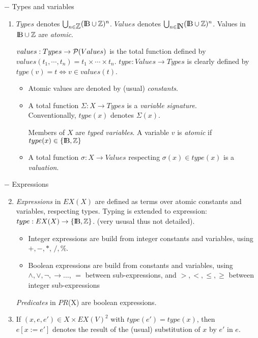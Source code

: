 \documentclass{article}
\newcommand{\NAT}{\mbox{\normalfont I$\!$N}}
\newcommand{\BOOL}{\mbox{\normalfont I$\!$B}}
\newcommand{\INT}{\mbox{\normalfont $\mathbb{Z}$}}
\begin{document}
\begin{definition}\label{def-expr}$~$\par
$-$ Types and variables
\begin{enumerate}
\item $Types$ denotes $\bigcup_{n\in \INT}(\BOOL\cup\INT)^n$. $Values$ denotes $\bigcup_{n\in \NAT}(\BOOL\cup\INT)^n$. Values in $\BOOL\cup\INT$ are {\em atomic}.\par
$values:Types\rightarrow {\cal P}(Values)$ is the total function defined by $values(t_1,\cdots,t_n)=t_1\times\cdots\times t_n$.
$type:Values \rightarrow Types$ is clearly defined by $type(v)=t \Leftrightarrow v\in values(t)$.
  \begin{itemize}
	\item Atomic values are denoted by (usual) {\em constants}.
  \item A total function $\Sigma: X\rightarrow Types$ is a {\em variable signature}.\\
	      Conventionally, $type(x)$ denotes $\Sigma(x)$.\par
	      Members of $X$ are {\em typed variables}. A variable $v$ is {\em atomic} if $type(x)\in\{\BOOL,\INT\}$ 
	\item A total function $\sigma:X\rightarrow Values$ respecting $\sigma(x)\in type(x)$ is a {\em valuation}.
	\end{itemize}
\end{enumerate}
$-$ Expressions
\begin{enumerate}\setcounter{enumi}{1}
\item {\em Expressions} in $EX(X)$ are defined as terms over atomic constants and variables, respecting types. Typing is extended to expression: $type:EX(X)\rightarrow\{\BOOL,\INT\}$. (very ususal thus not detailed).
      \begin{itemize}
      \item Integer expressions are build from integer constants and variables, using $+,-,*$, $/,\%$.
			\item Boolean expressions are build from constants and variables, using $\wedge,\vee, \neg,\rightarrow \ldots$, $=$ between sub-expressions, and $>,<,\leq,\geq$ between integer sub-expressions
			\end{itemize}
			{\em Predicates} in $P\!R$(X) are boolean expressions.
\item If $(x,e,e')\in X\times EX(V)^2$ with $type(e')=type(x)$, then\\ $e[x:=e']$ denotes the result of the (usual) substitution of $x$ by $e'$ in $e$.

\end{enumerate}
\end{definition}
\end{document}
